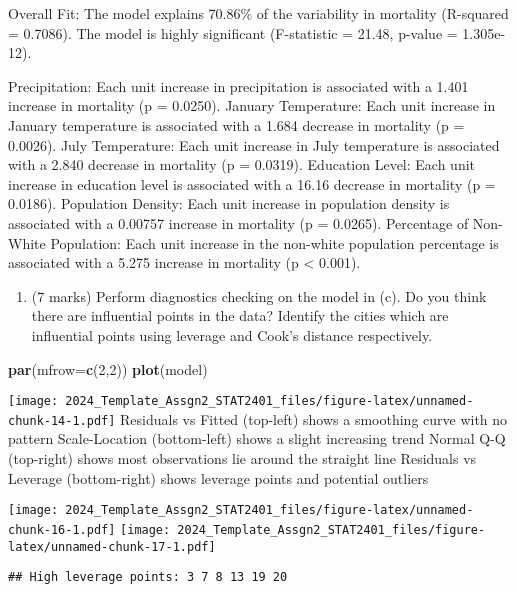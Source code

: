 \documentclass[
]{article}
\newenvironment{Shaded}{\begin{snugshade}}{\end{snugshade}}
\newcommand{\AttributeTok}[1]{\textcolor[rgb]{0.13,0.29,0.53}{#1}}
\newcommand{\DecValTok}[1]{\textcolor[rgb]{0.00,0.00,0.81}{#1}}
\newcommand{\FunctionTok}[1]{\textcolor[rgb]{0.13,0.29,0.53}{\textbf{#1}}}
\newcommand{\NormalTok}[1]{#1}
\providecommand{\tightlist}{%
  \setlength{\itemsep}{0pt}\setlength{\parskip}{0pt}}
\begin{document}
Overall Fit: The model explains 70.86\% of the variability in mortality
(R-squared = 0.7086). The model is highly significant (F-statistic =
21.48, p-value = 1.305e-12).

Precipitation: Each unit increase in precipitation is associated with a
1.401 increase in mortality (p = 0.0250). January Temperature: Each unit
increase in January temperature is associated with a 1.684 decrease in
mortality (p = 0.0026). July Temperature: Each unit increase in July
temperature is associated with a 2.840 decrease in mortality (p =
0.0319). Education Level: Each unit increase in education level is
associated with a 16.16 decrease in mortality (p = 0.0186). Population
Density: Each unit increase in population density is associated with a
0.00757 increase in mortality (p = 0.0265). Percentage of Non-White
Population: Each unit increase in the non-white population percentage is
associated with a 5.275 increase in mortality (p \textless{} 0.001).

\begin{enumerate}
\def\labelenumi{(\alph{enumi})}
\setcounter{enumi}{3}
\tightlist
\item
  (7 marks) Perform diagnostics checking on the model in (c). Do you
  think there are influential points in the data? Identify the cities
  which are influential points using leverage and Cook's distance
  respectively.
\end{enumerate}

\begin{Shaded}
\begin{Highlighting}[]
\FunctionTok{par}\NormalTok{(}\AttributeTok{mfrow=}\FunctionTok{c}\NormalTok{(}\DecValTok{2}\NormalTok{,}\DecValTok{2}\NormalTok{))}
\FunctionTok{plot}\NormalTok{(model)}
\end{Highlighting}
\end{Shaded}

\texttt{[image: 2024\_Template\_Assgn2\_STAT2401\_files/figure-latex/unnamed-chunk-14-1.pdf]}
Residuals vs Fitted (top-left) shows a smoothing curve with no pattern
Scale-Location (bottom-left) shows a slight increasing trend Normal Q-Q
(top-right) shows most observations lie around the straight line
Residuals vs Leverage (bottom-right) shows leverage points and potential
outliers

\texttt{[image: 2024\_Template\_Assgn2\_STAT2401\_files/figure-latex/unnamed-chunk-16-1.pdf]}
\texttt{[image: 2024\_Template\_Assgn2\_STAT2401\_files/figure-latex/unnamed-chunk-17-1.pdf]}

\begin{verbatim}
## High leverage points: 3 7 8 13 19 20
\end{verbatim}
\end{document}
